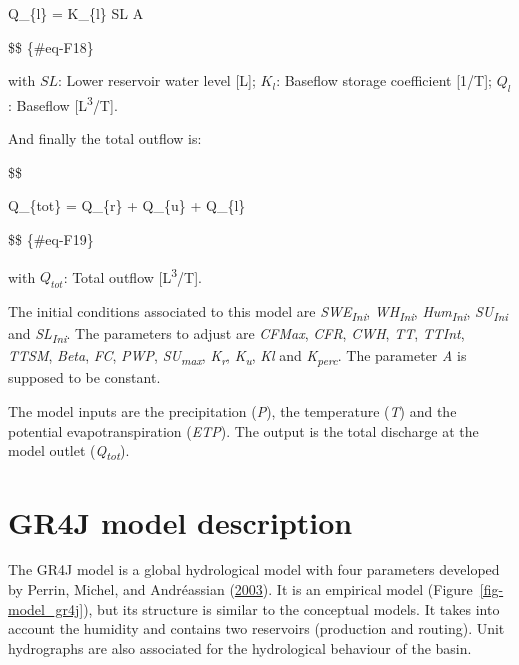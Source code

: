 \documentclass[
  letterpaper,
  DIV=11,
  numbers=noendperiod]{scrreprt}
\begin{document}
Q\_\{l\} = K\_\{l\} \cdot SL \cdot A

\$\$ \{\#eq-F18\}

with \(SL\): Lower reservoir water level {[}L{]}; \(K_l\): Baseflow
storage coefficient {[}1/T{]}; \(Q_l\): Baseflow
{[}L\textsuperscript{3}/T{]}.

And finally the total outflow is:

\$\$

Q\_\{tot\} = Q\_\{r\} + Q\_\{u\} + Q\_\{l\}

\$\$ \{\#eq-F19\}

with \(Q_{tot}\): Total outflow {[}L\textsuperscript{3}/T{]}.

The initial conditions associated to this model are
\emph{SWE\textsubscript{Ini}}, \emph{WH\textsubscript{Ini}},
\emph{Hum\textsubscript{Ini}}, \emph{SU\textsubscript{Ini}} and
\emph{SL\textsubscript{Ini}}. The parameters to adjust are \emph{CFMax},
\emph{CFR}, \emph{CWH}, \emph{TT}, \emph{TTInt}, \emph{TTSM},
\emph{Beta}, \emph{FC}, \emph{PWP}, \emph{SU\textsubscript{max}},
\emph{K\textsubscript{r}}, \emph{K\textsubscript{u}}, \emph{Kl} and
\emph{K\textsubscript{perc}}. The parameter \emph{A} is supposed to be
constant.

The model inputs are the precipitation (\emph{P}), the temperature
(\emph{T}) and the potential evapotranspiration (\emph{ETP}). The output
is the total discharge at the model outlet
(\emph{Q\textsubscript{tot}}).

\hypertarget{sec-model_gr4j}{%
\chapter{GR4J model description}\label{sec-model_gr4j}}

The GR4J model is a global hydrological model with four parameters
developed by Perrin, Michel, and Andréassian
(\protect\hyperlink{ref-perrin_improvement_2003}{2003}). It is an
empirical model (Figure~\ref{fig-model_gr4j}), but its structure is
similar to the conceptual models. It takes into account the humidity and
contains two reservoirs (production and routing). Unit hydrographs are
also associated for the hydrological behaviour of the basin.
\end{document}
